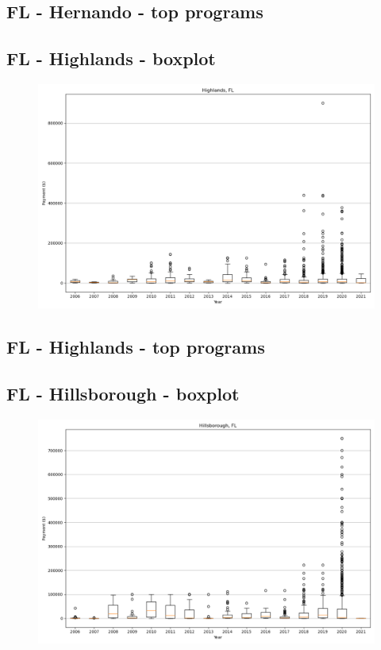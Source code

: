 \subsection*{FL - Hernando - top programs}

\newpage
\subsection*{FL - Highlands - boxplot}
\begin{figure}[h]
\centering
\includegraphics[width=7in]{../output/boxplots/counties/Highlands-FL_boxplot.png}
\end{figure}


\subsection*{FL - Highlands - top programs}

\newpage
\subsection*{FL - Hillsborough - boxplot}
\begin{figure}[h]
\centering
\includegraphics[width=7in]{../output/boxplots/counties/Hillsborough-FL_boxplot.png}
\end{figure}


